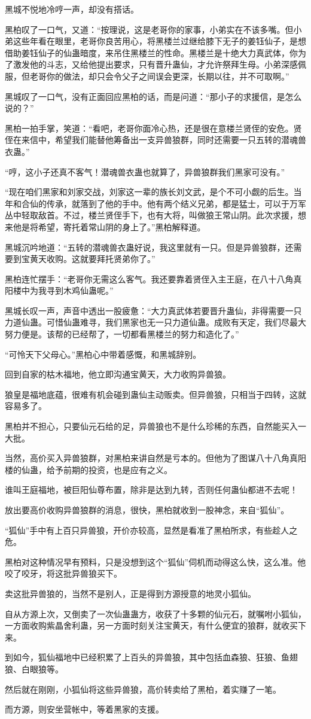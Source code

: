 \begin{this_body}
黑城不悦地冷哼一声，却没有搭话。

黑柏叹了一口气，又道：“按理说，这是老哥你的家事，小弟实在不该多嘴。但小弟这些年看在眼里，老哥你良苦用心，将黑楼兰过继给膝下无子的姜钰仙子，是想借助姜钰仙子的仙蛊暗度，来吊住黑楼兰的性命。黑楼兰是十绝大力真武体，你为了激发他的斗志，又给他提出要求，只有晋升蛊仙，才允许祭拜生母。小弟深感佩服，但老哥你的做法，却只会令父子之间误会更深，长期以往，并不可取啊。”

黑城叹了一口气，没有正面回应黑柏的话，而是问道：“那小子的求援信，是怎么说的？”

黑柏一拍手掌，笑道：“看吧，老哥你面冷心热，还是很在意楼兰贤侄的安危。贤侄在来信中，希望我们能替他筹备出一支异兽狼群，同时还需要一只五转的潜魂兽衣蛊。”

“哼，这小子还真不客气！潜魂兽衣蛊也就算了，异兽狼群我们黑家可没有。”

“现在咱们黑家和刘家交战，刘家这一辈的族长刘文武，是个不可小觑的后生。当年和合仙的传承，就落到了他的手中。他有两个结义兄弟，都是猛士，可以于万军丛中轻取敌首。不过，楼兰贤侄手下，也有大将，叫做狼王常山阴。此次求援，想来他是将希望，寄托着常山阴的身上了。”黑柏解释道。

黑城沉吟地道：“五转的潜魂兽衣蛊好说，我这里就有一只。但是异兽狼群，还需要到宝黄天收购。这就要拜托贤弟你了。”

黑柏连忙摆手：“老哥你无需这么客气。我还要靠着贤侄入主王庭，在八十八角真阳楼中为我寻到木鸡仙蛊呢。”

黑城长叹一声，声音中透出一股疲惫：“大力真武体若要晋升蛊仙，非得需要一只力道仙蛊。可惜仙蛊难寻，我们黑家也无一只力道仙蛊。成败有天定，我们尽最大努力便是。该帮的已经帮了，一切都看黑楼兰的努力和造化了。”

“可怜天下父母心。”黑柏心中带着感慨，和黑城辞别。

回到自家的枯木福地，他立即沟通宝黄天，大力收购异兽狼。

狼皇是福地底蕴，很难有机会碰到蛊仙主动贩卖。但异兽狼，只相当于四转，这就容易多了。

黑柏并不担心，只要仙元石给的足，异兽狼也不是什么珍稀的东西，自然能买入一大批。

当然，高价买入异兽狼群，对黑柏来讲自然是亏本的。但他为了图谋八十八角真阳楼的仙蛊，给予前期的投资，也是应有之义。

谁叫王庭福地，被巨阳仙尊布置，除非是达到九转，否则任何蛊仙都进不去呢！

放出要高价收购异兽狼群的消息，很快，黑柏就收到一股神念，来自“狐仙”。

“狐仙”手中有上百只异兽狼，开价亦较高，显然是看准了黑柏所求，有些趁人之危。

黑柏对这种情况早有预料，只是没想到这个“狐仙”伺机而动得这么快，这么准。他咬了咬牙，将这批异兽狼买下。

卖这批异兽狼的，当然不是别人，正是得到方源授意的地灵小狐仙。

自从方源上次，又倒卖了一次仙蛊蛊方，收获了十多颗的仙元石，就嘱咐小狐仙，一方面收购紫晶舍利蛊，另一方面时刻关注宝黄天，有什么便宜的狼群，就收买下来。

到如今，狐仙福地中已经积累了上百头的异兽狼，其中包括血森狼、狂狼、鱼翅狼、白眼狼等。

然后就在刚刚，小狐仙将这些异兽狼，高价转卖给了黑柏，着实赚了一笔。

而方源，则安坐营帐中，等着黑家的支援。

\end{this_body}

